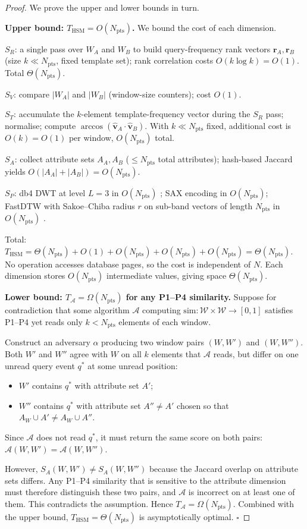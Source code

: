 \documentclass[10pt,twocolumn,a4paper]{article}
\newcommand{\SR}{S_{R}}
\newcommand{\SV}{S_{V}}
\newcommand{\ST}{S_{T}}
\newcommand{\SA}{S_{A}}
\newcommand{\SPER}{S_{P}}
\newcommand{\Npts}{N_{\mathrm{pts}}}
\begin{document}
\begin{proof}
We prove the upper and lower bounds in turn.

\textbf{Upper bound: $T_{\mathrm{HSM}}=O(\Npts)$.}
We bound the cost of each dimension.

$\SR$: a single pass over $W_A$ and $W_B$ to build query-frequency
rank vectors $\mathbf{r}_A,\mathbf{r}_B$ (size $k\!\ll\!\Npts$, fixed
template set); rank correlation costs $O(k\log k)=O(1)$. Total
$\Theta(\Npts)$.

$\SV$: compare $|W_A|$ and $|W_B|$ (window-size counters); cost $O(1)$.

$\ST$: accumulate the $k$-element template-frequency vector during the
$\SR$ pass; normalise; compute
$\arccos(\hat{\mathbf{v}}_A\cdot\hat{\mathbf{v}}_B)$. With $k\!\ll\!\Npts$
fixed, additional cost is $O(k)=O(1)$ per window, $O(\Npts)$ total.

$\SA$: collect attribute sets $A_A,A_B$ ($\leq\Npts$ total attributes);
hash-based Jaccard yields $O(|A_A|+|A_B|)=O(\Npts)$.

$\SPER$: db4 DWT at level $L=3$ in $O(\Npts)$
\cite{Daubechies1992Wavelets}; SAX encoding in $O(\Npts)$;
FastDTW with Sakoe--Chiba radius $r$ on sub-band vectors of length
$\Npts$ in $O(\Npts)$ \cite{Salvador2007FastDTW}.

Total: $T_{\mathrm{HSM}}=\Theta(\Npts)+O(1)+O(\Npts)+O(\Npts)+O(\Npts)
=\Theta(\Npts)$. No operation accesses database pages, so the cost
is independent of $N$. Each dimension stores $O(\Npts)$ intermediate
values, giving space $\Theta(\Npts)$.

\textbf{Lower bound: $T_\mathcal{A}=\Omega(\Npts)$ for any P1--P4
similarity.}
Suppose for contradiction that some algorithm $\mathcal{A}$ computing
$\mathrm{sim}:\mathcal{W}\!\times\!\mathcal{W}\!\to\![0,1]$ satisfies
P1--P4 yet reads only $k<\Npts$ elements of each window.

Construct an adversary $\alpha$ producing two window pairs $(W,W')$
and $(W,W'')$. Both $W'$ and $W''$ agree with $W$ on all $k$ elements
that $\mathcal{A}$ reads, but differ on one unread query event $q^{*}$
at some unread position:
\begin{itemize}\itemsep0pt
  \item $W'$ contains $q^{*}$ with attribute set $A'$;
  \item $W''$ contains $q^{*}$ with attribute set $A''\neq A'$ chosen
  so that $A_W\cup A'\neq A_W\cup A''$.
\end{itemize}
Since $\mathcal{A}$ does not read $q^{*}$, it must return the same
score on both pairs: $\mathcal{A}(W,W')=\mathcal{A}(W,W'')$.

However, $\SA(W,W')\neq\SA(W,W'')$ because the Jaccard overlap on
attribute sets differs. Any P1--P4 similarity that is sensitive to the
attribute dimension must therefore distinguish these two pairs, and
$\mathcal{A}$ is incorrect on at least one of them. This contradicts
the assumption. Hence $T_\mathcal{A}=\Omega(\Npts)$. Combined with the
upper bound, $T_{\mathrm{HSM}}=\Theta(\Npts)$ is asymptotically optimal.
\hfill$\square$
\end{proof}
\end{document}
